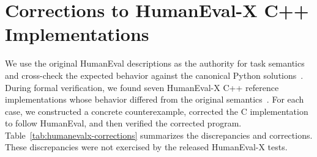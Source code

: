 \section{Corrections to HumanEval-X C++ Implementations}
\label{app:humanevalx-corrections}

We use the original HumanEval descriptions as the authority for task semantics
and cross-check the expected behavior against the canonical Python
solutions~\cite{chen2021evaluating}. During formal verification, we found seven
HumanEval-X C++ reference implementations whose behavior differed from the
original semantics~\cite{zheng2023codegeex}. For each case, we constructed a
concrete counterexample, corrected the C implementation to follow HumanEval,
and then verified the corrected program. Table~\ref{tab:humanevalx-corrections}
summarizes the discrepancies and corrections. These discrepancies were not
exercised by the released HumanEval-X tests.

